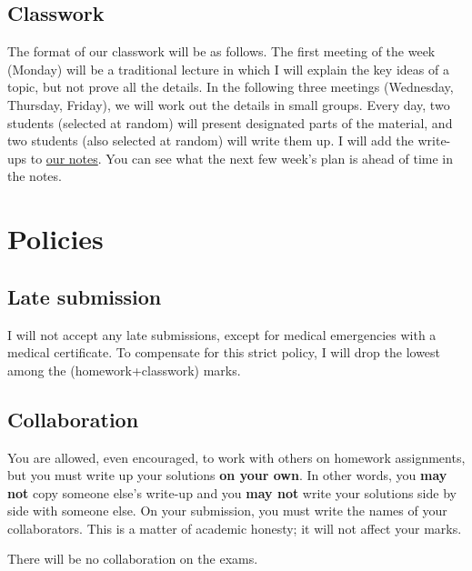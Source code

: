\documentclass[11pt]{article}
\begin{document}
\subsection{Classwork}
\label{sec:org937fc4f}
The format of our classwork will be as follows. The first meeting of the week (Monday) will be a traditional lecture in which I will explain the key ideas of a topic, but not prove all the details. In the following three meetings (Wednesday, Thursday, Friday), we will work out the details in small groups. Every day, two students (selected at random) will present designated parts of the material, and two students (also selected at random) will write them up. I will add the write-ups to \href{notes}{our notes}. You can see what the next few week's plan is ahead of time in the notes.

\section{Policies}
\label{sec:orgffe3683}
\subsection{Late submission}
\label{sec:orga9c143b}
I will not accept any late submissions, except for medical emergencies with a medical certificate.
To compensate for this strict policy, I will drop the lowest among the (homework+classwork) marks.

\subsection{Collaboration}
\label{sec:orgc900c5b}
You are allowed, even encouraged, to work with others on homework assignments, but you must write up your solutions \textbf{on your own}. In other words, you \textbf{may not} copy someone else's write-up and you \textbf{may not} write your solutions side by side with someone else. On your submission, you must write the names of your collaborators. This is a matter of academic honesty; it will not affect your marks. 

There will be no collaboration on the exams.
\end{document}
